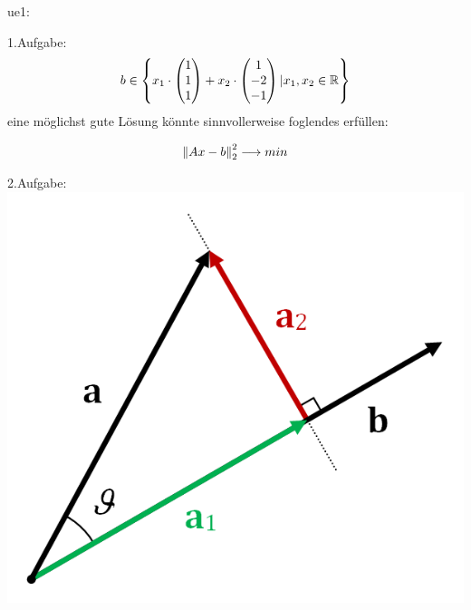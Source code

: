 ue1:

1.Aufgabe:
\begin{equation}
	\begin{split}
		b \in \left\{ x_1 \cdot \begin{pmatrix*} 1\\ 1\\ 1 \end{pmatrix*} + x_2 \cdot \begin{pmatrix*} 1\\ -2\\ -1 \end{pmatrix*} | x_1, x_2 \in \R \right\}
	\end{split}
\end{equation}
eine möglichst \glqq gute\grqq{} Lösung könnte sinnvollerweise foglendes erfüllen:

\[
	\left\lVert Ax-b\right\rVert^2_2 \longrightarrow min
\]

2.Aufgabe:
{
	\includegraphics[scale=.3]{Projection_and_rejection.png}
}

